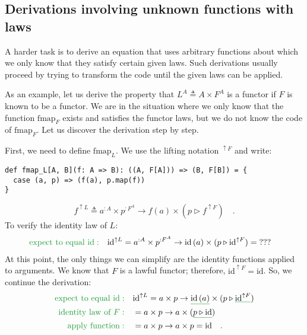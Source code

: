 \subsection{Derivations involving unknown functions with laws}

A harder task is to derive an equation that uses arbitrary functions
about which we only know that they satisfy certain given laws. Such
derivations usually proceed by trying to transform the code until
the given laws can be applied.

As an example, let us derive the property that $L^{A}\triangleq A\times F^{A}$
is a functor if $F$ is known to be a functor. We are in the situation
where we only know that the function $\text{fmap}_{F}$ exists and
satisfies the functor laws, but we do not know the code of $\text{fmap}_{F}$.
Let us discover the derivation step by step.

First, we need to define $\text{fmap}_{L}$. We use the lifting notation
$^{\uparrow F}$ and write:
\begin{lstlisting}
def fmap_L[A, B](f: A => B): ((A, F[A])) => (B, F[B]) = {
  case (a, p) => (f(a), p.map(f))
}
\end{lstlisting}
\[
f^{\uparrow L}\triangleq a^{:A}\times p^{:F^{A}}\rightarrow f(a)\times(p\triangleright f^{\uparrow F})\quad.
\]
To verify the identity law of $L$:
\begin{align*}
{\color{greenunder}\text{expect to equal }\text{id}:}\quad & \text{id}^{\uparrow L}=a^{:A}\times p^{:F^{A}}\rightarrow\text{id}\,(a)\times(p\triangleright\text{id}^{\uparrow F})=\text{???}
\end{align*}
At this point, the only things we can simplify are the identity functions
applied to arguments. We know that $F$ is a lawful functor; therefore,
$\text{id}^{\uparrow F}=\text{id}$. So, we continue the derivation:
\begin{align*}
{\color{greenunder}\text{expect to equal }\text{id}:}\quad & \text{id}^{\uparrow L}=a\times p\rightarrow\gunderline{\text{id}\,(a)}\times(p\triangleright\gunderline{\text{id}^{\uparrow F}})\\
{\color{greenunder}\text{identity law of }F:}\quad & =a\times p\rightarrow a\times(\gunderline{p\triangleright\text{id}})\\
{\color{greenunder}\text{apply function}:}\quad & =a\times p\rightarrow a\times p=\text{id}\quad.
\end{align*}

